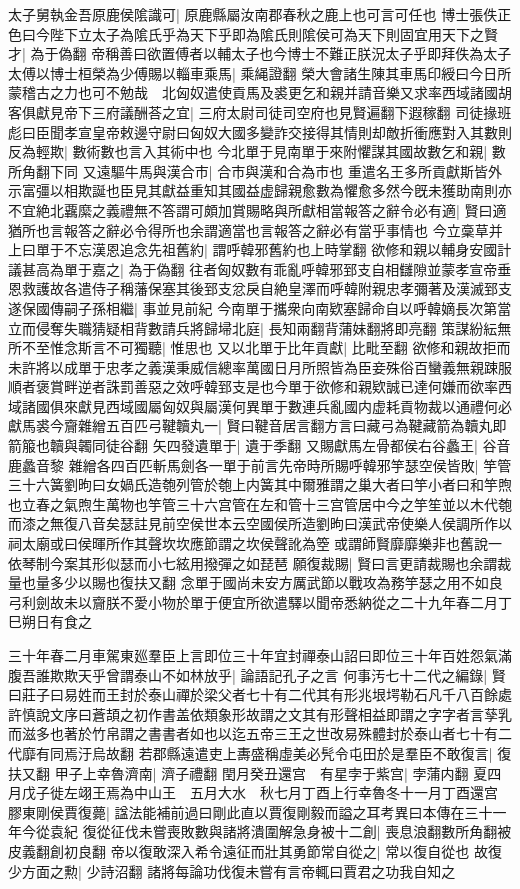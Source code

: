 太子舅執金吾原鹿侯隂識可|{
	原鹿縣屬汝南郡春秋之鹿上也可言可任也}
博士張佚正色曰今陛下立太子為隂氏乎為天下乎即為隂氏則隂侯可為天下則固宜用天下之賢才|{
	為于偽翻}
帝稱善曰欲置傅者以輔太子也今博士不難正朕況太子乎即拜佚為太子太傅以博士桓榮為少傅賜以輜車乘馬|{
	乘䋲證翻}
榮大會諸生陳其車馬印綬曰今日所蒙稽古之力也可不勉哉　北匈奴遣使貢馬及裘更乞和親并請音樂又求率西域諸國胡客俱獻見帝下三府議酬荅之宜|{
	三府太尉司徒司空府也見賢遍翻下遐稼翻}
司徒掾班彪曰臣聞孝宣皇帝敕邊守尉曰匈奴大國多變詐交接得其情則却敵折衝應對入其數則反為輕欺|{
	數術數也言入其術中也}
今北單于見南單于來附懼謀其國故數乞和親|{
	數所角翻下同}
又遠驅牛馬與漢合市|{
	合市與漢和合為市也}
重遣名王多所貢獻斯皆外示富彊以相欺誕也臣見其獻益重知其國益虚歸親愈數為懼愈多然今旣未獲助南則亦不宜絶北覊縻之義禮無不答謂可頗加賞賜略與所獻相當報答之辭令必有適|{
	賢曰適猶所也言報答之辭必令得所也余謂適當也言報答之辭必有當乎事情也}
今立稾草并上曰單于不忘漢恩追念先祖舊約|{
	謂呼韓邪舊約也上時掌翻}
欲修和親以輔身安國計議甚高為單于嘉之|{
	為于偽翻}
往者匈奴數有乖亂呼韓邪郅支自相讎隙並蒙孝宣帝垂恩救護故各遣侍子稱藩保塞其後郅支忿戾自絶皇澤而呼韓附親忠孝彌著及漢滅郅支遂保國傳嗣子孫相繼|{
	事並見前紀}
今南單于攜衆向南欵塞歸命自以呼韓嫡長次第當立而侵奪失職猜疑相背數請兵將歸埽北庭|{
	長知兩翻背蒲妹翻將即亮翻}
策謀紛紜無所不至惟念斯言不可獨聽|{
	惟思也}
又以北單于比年貢獻|{
	比毗至翻}
欲修和親故拒而未許將以成單于忠孝之義漢秉威信總率萬國日月所照皆為臣妾殊俗百蠻義無親踈服順者褒賞畔逆者誅罰善惡之效呼韓郅支是也今單于欲修和親欵誠已達何嫌而欲率西域諸國俱來獻見西域國屬匈奴與屬漢何異單于數連兵亂國内虚耗貢物裁以通禮何必獻馬裘今齎雜繒五百匹弓鞬韥丸一|{
	賢曰鞬音居言翻方言曰藏弓為鞬藏箭為韥丸即箭箙也韥與韣同徒谷翻}
矢四發遺單于|{
	遺于季翻}
又賜獻馬左骨都侯右谷蠡王|{
	谷音鹿蠡音黎}
雜繒各四百匹斬馬劍各一單于前言先帝時所賜呼韓邪竽瑟空侯皆敗|{
	竽管三十六簧劉昫曰女媧氏造匏列管於匏上内簧其中爾雅謂之巢大者曰竽小者曰和竽煦也立春之氣煦生萬物也竽管三十六宫管在左和管十三宫管居中今之竽笙並以木代匏而漆之無復八音矣瑟註見前空侯世本云空國侯所造劉昫曰漢武帝使樂人侯調所作以祠太廟或曰侯暉所作其聲坎坎應節謂之坎侯聲訛為箜或謂師賢靡靡樂非也舊說一依琴制今案其形似瑟而小七絃用撥彈之如琵琶}
願復裁賜|{
	賢曰言更請裁賜也余謂裁量也量多少以賜也復扶又翻}
念單于國尚未安方厲武節以戰攻為務竽瑟之用不如良弓利劍故未以齎朕不愛小物於單于便宜所欲遣驛以聞帝悉納從之二十九年春二月丁巳朔日有食之

三十年春二月車駕東廵羣臣上言即位三十年宜封禪泰山詔曰即位三十年百姓怨氣滿腹吾誰欺欺天乎曾謂泰山不如林放乎|{
	論語記孔子之言}
何事汚七十二代之編錄|{
	賢曰莊子曰易姓而王封於泰山禪於梁父者七十有二代其有形兆垠堮勒石凡千八百餘處許慎說文序曰蒼頡之初作書盖依類象形故謂之文其有形聲相益即謂之字字者言孶乳而滋多也著於竹帛謂之書書者如也以迄五帝三王之世改易殊體封於泰山者七十有二代靡有同焉汙烏故翻}
若郡縣遠遣吏上夀盛稱虛美必髠令屯田於是羣臣不敢復言|{
	復扶又翻}
甲子上幸魯濟南|{
	濟子禮翻}
閏月癸丑還宫　有星孛于紫宫|{
	孛蒲内翻}
夏四月戊子徙左翊王焉為中山王　五月大水　秋七月丁酉上行幸魯冬十一月丁酉還宫　膠東剛侯賈復薨|{
	諡法能補前過曰剛此直以賈復剛毅而謚之耳考異曰本傳在三十一年今從袁紀}
復從征伐未嘗喪敗數與諸將潰圍解急身被十二創|{
	喪息浪翻數所角翻被皮義翻創初良翻}
帝以復敢深入希令遠征而壯其勇節常自從之|{
	常以復自從也}
故復少方面之勲|{
	少詩沼翻}
諸將每論功伐復未嘗有言帝輒曰賈君之功我自知之

